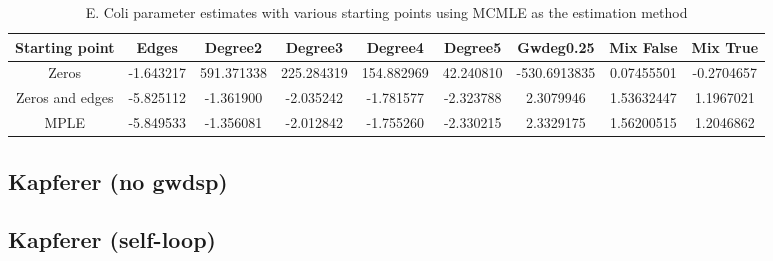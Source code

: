 \begin{table}[H]
\centering
\scriptsize
\begin{tabular}{|| c | c | c | c | c | c | c | c | c ||}
\hline
Starting point & Edges & Degree2 & Degree3 & Degree4 & Degree5 & Gwdeg0.25 & Mix False & Mix True \\
\hline
Zeros & -1.643217 & 591.371338 & 225.284319 & 154.882969 & 42.240810 & -530.6913835 & 0.07455501 & -0.2704657 \\
\hline
Zeros and edges & -5.825112 & -1.361900 & -2.035242 & -1.781577 & -2.323788 & 2.3079946 & 1.53632447 & 1.1967021 \\
\hline
MPLE & -5.849533	 & -1.356081 & -2.012842 & -1.755260 & -2.330215 & 2.3329175 & 1.56200515 & 1.2046862 \\
\hline
\end{tabular}
\label{t2:params_ecoli_mcmle}
\caption{E. Coli parameter estimates with various starting points using MCMLE as the estimation method}
\end{table}


\subsection{Kapferer (no gwdsp)}


\subsection{Kapferer (self-loop)}



